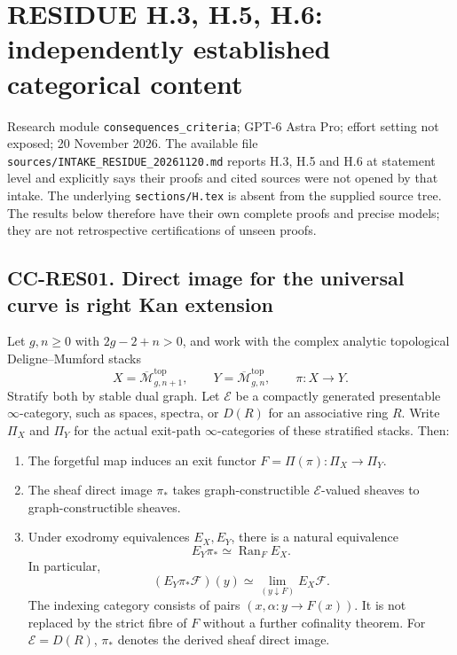 \section{RESIDUE H.3, H.5, H.6: independently established categorical
content}\label{residue-h.3-h.5-h.6-independently-established-categorical-content}

Research module \texttt{consequences\_criteria}; GPT-6 Astra Pro; effort
setting not exposed; 20 November 2026. The available file
\texttt{sources/INTAKE\_RESIDUE\_20261120.md} reports H.3, H.5 and H.6
at statement level and explicitly says their proofs and cited sources
were not opened by that intake. The underlying \texttt{sections/H.tex}
is absent from the supplied source tree. The results below therefore
have their own complete proofs and precise models; they are not
retrospective certifications of unseen proofs.

\subsection{CC-RES01. Direct image for the universal curve is right Kan
extension}\label{cc-res01.-direct-image-for-the-universal-curve-is-right-kan-extension}

Let \(g,n\geq0\) with \(2g-2+n>0\), and work with the complex analytic
topological Deligne--Mumford stacks \[
X=\overline{\mathcal M}_{g,n+1}^{\mathrm{top}},\qquad
Y=\overline{\mathcal M}_{g,n}^{\mathrm{top}},\qquad
\pi:X\longrightarrow Y.
\] Stratify both by stable dual graph. Let \(\mathcal E\) be a compactly
generated presentable \(\infty\)-category, such as spaces, spectra, or
\(D(R)\) for an associative ring \(R\). Write \(\Pi_X\) and \(\Pi_Y\)
for the actual exit-path \(\infty\)-categories of these stratified
stacks. Then:

\begin{enumerate}
\def\labelenumi{\arabic{enumi}.}
\tightlist
\item
  The forgetful map induces an exit functor
  \(F=\Pi(\pi):\Pi_X\to\Pi_Y\).
\item
  The sheaf direct image \(\pi_*\) takes graph-constructible
  \(\mathcal E\)-valued sheaves to graph-constructible sheaves.
\item
  Under exodromy equivalences \(E_X,E_Y\), there is a natural
  equivalence \[
  E_Y\pi_*\simeq\operatorname{Ran}_{F}E_X.
  \tag{CC-RES.1}
  \] In particular, \[
  (E_Y\pi_*\mathcal F)(y)\simeq
  \lim_{(y\downarrow F)} E_X\mathcal F.
  \tag{CC-RES.2}
  \] The indexing category consists of pairs \((x,\alpha:y\to F(x))\).
  It is not replaced by the strict fibre of \(F\) without a further
  cofinality theorem. For \(\mathcal E=D(R)\), \(\pi_*\) denotes the
  derived sheaf direct image.
\end{enumerate}

